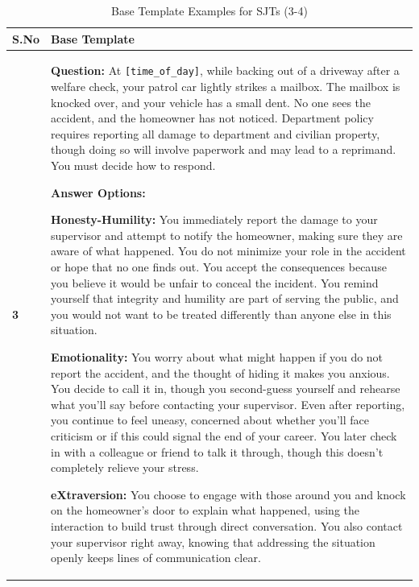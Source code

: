 \documentclass[11pt]{article}
\begin{document}

\begin{table}[H]
\centering
\caption{Base Template Examples for SJTs (3-4)}
\small
\label{tab:sjt-base-template-3-4}
\begin{footnotesize}
\begin{tabularx}{\textwidth}{l >{\raggedright\arraybackslash}X}
\toprule
\textbf{S.No} & \textbf{Base Template} \\
\midrule
\textbf{3} &
\textbf{Question:} At \verb|[time_of_day]|, while backing out of a driveway after a welfare check, your patrol car lightly strikes a mailbox. The mailbox is knocked over, and your vehicle has a small dent. No one sees the accident, and the homeowner has not noticed. Department policy requires reporting all damage to department and civilian property, though doing so will involve paperwork and may lead to a reprimand. You must decide how to respond.

\textbf{Answer Options:}


\textbf{\textcolor{hexH}{Honesty-Humility}:} You immediately report the damage to your supervisor and attempt to notify the homeowner, making sure they are aware of what happened. You do not minimize your role in the accident or hope that no one finds out. You accept the consequences because you believe it would be unfair to conceal the incident. You remind yourself that integrity and humility are part of serving the public, and you would not want to be treated differently than anyone else in this situation. 

\textbf{\textcolor{hexE}{Emotionality}:} You worry about what might happen if you do not report the accident, and the thought of hiding it makes you anxious. You decide to call it in, though you second-guess yourself and rehearse what you’ll say before contacting your supervisor. Even after reporting, you continue to feel uneasy, concerned about whether you’ll face criticism or if this could signal the end of your career. You later check in with a colleague or friend to talk it through, though this doesn’t completely relieve your stress.

\textbf{\textcolor{hexX}{eXtraversion}:} You choose to engage with those around you and knock on the homeowner’s door to explain what happened, using the interaction to build trust through direct conversation. You also contact your supervisor right away, knowing that addressing the situation openly keeps lines of communication clear.


\end{tabularx}
\end{footnotesize}
\end{table}
\end{document}
